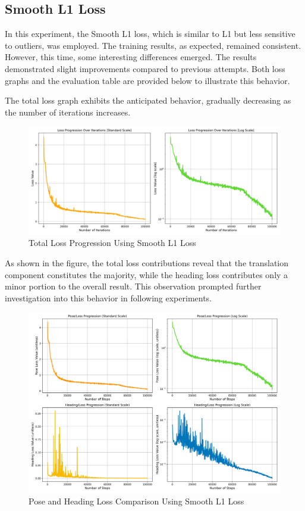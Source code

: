 \subsection*{Smooth L1 Loss}
In this experiment, the Smooth L1 loss, which is similar to L1 but less sensitive to outliers, was employed. The training results, as expected, remained consistent. However, this time, some interesting differences emerged. The results demonstrated slight improvements compared to previous attempts. Both loss graphs and the evaluation table are provided below to illustrate this behavior.

The total loss graph exhibits the anticipated behavior, gradually decreasing as the number of iterations increases. 
\begin{figure}[H]
    \centering
    \includegraphics[width=1\linewidth]{LateX//figs/loss_total_l1s_progression_comparison.png}
    \caption{Total Loss Progression Using Smooth L1 Loss}
    \label{fig:smooth-l1-total-loss}
\end{figure}

As shown in the figure, the total loss contributions reveal that the translation component constitutes the majority, while the heading loss contributes only a minor portion to the overall result. This observation prompted further investigation into this behavior in following experiments.
\begin{figure}[H]
    \centering
    \includegraphics[width=1\linewidth]{LateX//figs/l1s_pose_heading_loss_comparison.png}
    \caption{Pose and Heading Loss Comparison Using Smooth L1 Loss}
    \label{fig:smooth-l1-pose-heading-loss}
\end{figure}

